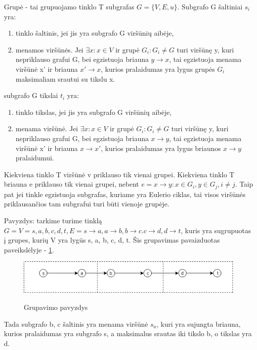Grupė - tai grupuojamo tinklo T subgrafas $G= \{V, E, u\}$. Subgrafo G šaltiniai $s_i$ yra:
\begin{enumerate}
	\item  tinklo šaltinis, jei jis yra subgrafo G viršūnių aibėje,
	\item  menamos viršūnės. Jei $\exists x: x \in V$ ir grupė $G_i : G_i \neq G$ turi viršūnę y, kuri nepriklauso grafui G, bei egzistuoja briauna $y \rightarrow x$, tai egzistuoja menama viršūnė x' ir briauna $x' \rightarrow x$, kurios pralaidumas yra lygus grupės $G_i$ maksimaliam srautui su tikslu x.
\end{enumerate}
subgrafo G tikslai $t_i$ yra:
\begin{enumerate}
	\item  tinklo tikslas, jei jis yra subgrafo G viršūnių aibėje,
	\item  menama viršūnė. Jei $\exists x: x \in V$ ir grupė $G_i : G_i \neq G$ turi viršūnę y, kuri nepriklauso grafui G, bei egzistuoja briauna $x \rightarrow y$, tai egzistuoja menama viršūnė x' ir briauna $x \rightarrow x'$, kurios pralaidumas yra lygus briaunos $x \rightarrow y$ pralaidumui.
\end{enumerate}

Kiekviena tinklo T viršūnė v priklauso tik vienai grupei. Kiekviena tinklo T briauna e priklauso tik vienai grupei, nebent $e = x \rightarrow y : x \in G_i, y \in G_j, i \neq j$. Taip pat jei tinkle egzistuoja subgrafas, kuriame yra Eulerio ciklas, tai visos viršūnės priklausančios tam subgrafui turi būti vienoje grupėje.

Pavyzdys: tarkime turime tinklą $G = {V={s, a, b, c, d, t}, E={s  \rightarrow a, a \rightarrow b, b \rightarrow c. c \rightarrow d, d \rightarrow t}}$, kuris yra sugrupuotas į grupes, kurių V yra lygūs {s, a}, {b, c}, {d, t}. Šis grupavimas pavaizduotas paveikslėlyje - \ref{fig:grupavimas}.
\begin{figure}[h]
	\caption{Grupavimo pavyzdys}
	\centering
	\includegraphics[width=\textwidth]{img/grupes_pavyzdziui.png}
	\label{fig:grupavimas}
\end{figure}

Tada subgrafo {b, c} šaltinis yra menama viršūnė $s_a$, kuri yra sujungta briauna, kurios pralaidumas yra subgrafo {s, a} maksimalus srautas iki tikslo b, o tikslas yra d.